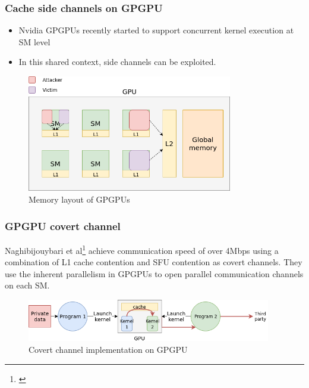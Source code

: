 \documentclass[10pt,usenames,dvipsnames]{beamer}
\begin{document}
\begin{frame}
\frametitle{Cache side channels on GPGPU}
\begin{itemize}
\item Nvidia GPGPUs recently started to support concurrent kernel execution at SM level
\item In this shared context, side channels can be exploited.
\end{itemize}

\begin{figure}
    \centering
    \includegraphics[width=0.8\textwidth]{gpgpu}
    \caption{Memory layout of GPGPUs}
\end{figure}
\end{frame}

\begin{frame}
\frametitle{GPGPU covert channel}
Naghibijouybari et al\footnote{\cite{naghi}} achieve communication speed of over 4Mbps
using a combination of L1 cache contention and SFU contention as covert channels.
They use the inherent parallelism in GPGPUs to open parallel communication channels on
each SM.
\vspace{0.5in}
\begin{figure}
    \centering
    \includegraphics[width=0.95\textwidth]{covert_channel}
    \caption{Covert channel implementation on GPGPU}
\end{figure}
\end{frame}
\end{document}
